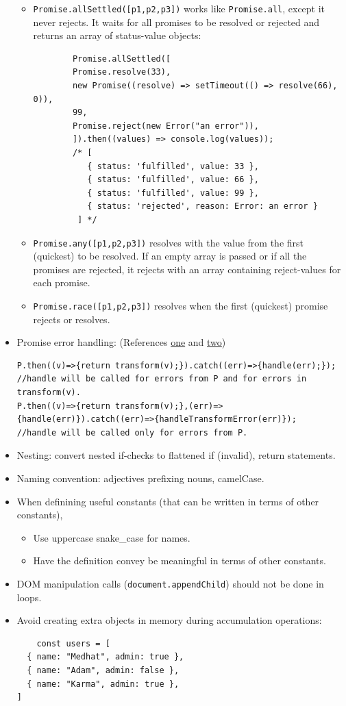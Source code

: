\documentclass{report}
\begin{document}
\begin{itemize}
\begin{itemize}
\begin{lstlisting}
    \end{lstlisting}
    \item \texttt{Promise.allSettled([p1,p2,p3])} works like \texttt{Promise.all}, except it never rejects. It waits for
    all promises to be resolved or rejected and returns an array of status-value objects:
    \begin{lstlisting}
        Promise.allSettled([
        Promise.resolve(33),
        new Promise((resolve) => setTimeout(() => resolve(66), 0)),
        99,
        Promise.reject(new Error("an error")),
        ]).then((values) => console.log(values));
        /* [
           { status: 'fulfilled', value: 33 },
           { status: 'fulfilled', value: 66 },
           { status: 'fulfilled', value: 99 },
           { status: 'rejected', reason: Error: an error }
         ] */
    \end{lstlisting}
    \item \texttt{Promise.any([p1,p2,p3])} resolves with the value from the first (quickest) to be resolved. If an empty array is passed or if all the promises are rejected, it rejects with an array containing reject-values for each promise.
    \item \texttt{Promise.race([p1,p2,p3])} resolves when the first (quickest) promise rejects or resolves. 
\end{itemize}
\item Promise error handling: (References \href{https://stackoverflow.com/questions/42013104/placement-of-catch-before-and-after-then}{one} and \href{https://stackoverflow.com/questions/24662289/when-is-thensuccess-fail-considered-an-antipattern-for-promises}{two})
\begin{lstlisting}
P.then((v)=>{return transform(v);}).catch((err)=>{handle(err);});
//handle will be called for errors from P and for errors in transform(v).
P.then((v)=>{return transform(v);},(err)=>{handle(err)}).catch((err)=>{handleTransformError(err)});
//handle will be called only for errors from P.
\end{lstlisting}
\item Nesting: convert nested if-checks to flattened if (invalid), return statements.
\item Naming convention: adjectives prefixing nouns, camelCase.
\item When definining useful constants (that can be written in terms of other constants),
\begin{itemize}
    \item Use uppercase snake\_case for names.
    \item Have the definition convey be meaningful in terms of other constants.
\end{itemize}
\item DOM manipulation calls (\texttt{document.appendChild}) should not be done in loops.
\item Avoid creating extra objects in memory during accumulation operations:
\begin{lstlisting}
    const users = [
  { name: "Medhat", admin: true },
  { name: "Adam", admin: false },
  { name: "Karma", admin: true },
]


\end{lstlisting}
\end{itemize}
\end{document}
